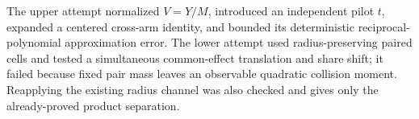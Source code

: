 The upper attempt normalized \(V=Y/M\), introduced an independent pilot \(t\), expanded a centered cross-arm identity, and bounded its deterministic reciprocal-polynomial approximation error.  The lower attempt used radius-preserving paired cells and tested a simultaneous common-effect translation and share shift; it failed because fixed pair mass leaves an observable quadratic collision moment.  Reapplying the existing radius channel was also checked and gives only the already-proved product separation.